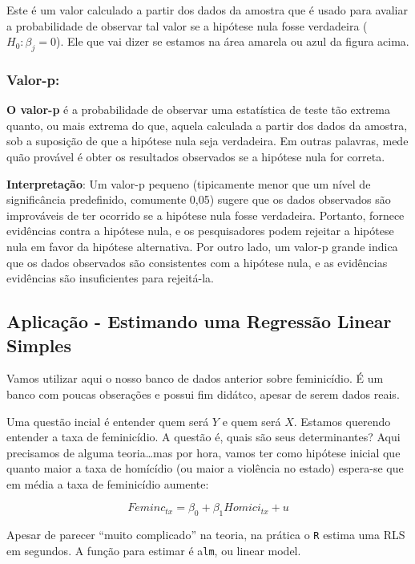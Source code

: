 \documentclass[
  letterpaper,
  DIV=11,
  numbers=noendperiod]{scrreprt}
\begin{document}
Este é um valor calculado a partir dos dados da amostra que é usado para
avaliar a probabilidade de observar tal valor se a hipótese nula fosse
verdadeira (\(H_0: {\beta_j}=0\)). Ele que vai dizer se estamos na área
amarela ou azul da figura acima.

\subsubsection{Valor-p:}\label{valor-p}

\textbf{O valor-p} é a probabilidade de observar uma estatística de
teste tão extrema quanto, ou mais extrema do que, aquela calculada a
partir dos dados da amostra, sob a suposição de que a hipótese nula seja
verdadeira. Em outras palavras, mede quão provável é obter os resultados
observados se a hipótese nula for correta.

\textbf{Interpretação}: Um valor-p pequeno (tipicamente menor que um
nível de significância predefinido, comumente 0,05) sugere que os dados
observados são improváveis de ter ocorrido se a hipótese nula fosse
verdadeira. Portanto, fornece evidências contra a hipótese nula, e os
pesquisadores podem rejeitar a hipótese nula em favor da hipótese
alternativa. Por outro lado, um valor-p grande indica que os dados
observados são consistentes com a hipótese nula, e as evidências
evidências são insuficientes para rejeitá-la.

\subsection{Aplicação - Estimando uma Regressão Linear
Simples}\label{aplicauxe7uxe3o---estimando-uma-regressuxe3o-linear-simples}

Vamos utilizar aqui o nosso banco de dados anterior sobre feminicídio. É
um banco com poucas obserações e possui fim didátco, apesar de serem
dados reais.

Uma questão incial é entender quem será \(Y\) e quem será \(X\). Estamos
querendo entender a taxa de feminicídio. A questão é, quais são seus
determinantes? Aqui precisamos de alguma teoria\ldots mas por hora,
vamos ter como hipótese inicial que quanto maior a taxa de homícídio (ou
maior a violência no estado) espera-se que em média a taxa de
feminicídio aumente:

\[Feminc_{tx} = \beta_0 + \beta_1 Homici_{tx} + u\]

Apesar de parecer ``muito complicado'' na teoria, na prática o
\texttt{R} estima uma RLS em segundos. A função para estimar é
a\texttt{lm}, ou linear model.
\end{document}

